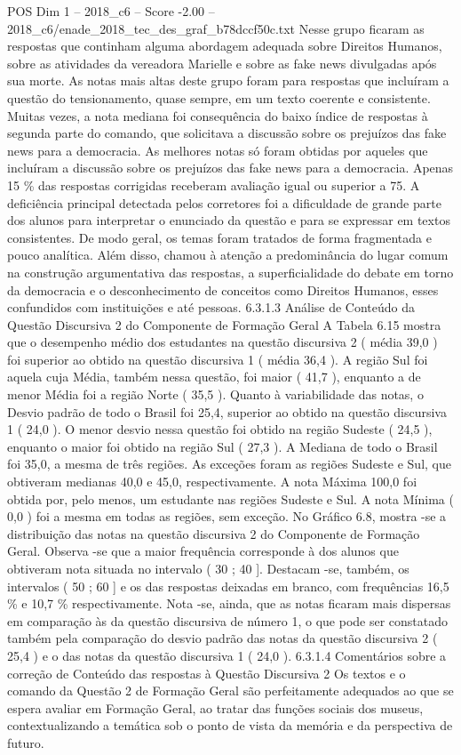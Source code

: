 \begin{textsample}{POS Dim 1 – 2018\_c6 – Score -2.00 – 2018\_c6/enade\_2018\_tec\_des\_graf\_b78dccf50c.txt}
Nesse grupo ficaram as respostas que continham alguma abordagem adequada sobre Direitos Humanos, sobre as atividades da vereadora Marielle e sobre as fake news divulgadas após sua morte.
As notas mais altas deste grupo foram para respostas que incluíram a questão do tensionamento, quase sempre, em um texto coerente e consistente.
Muitas vezes, a nota mediana foi consequência do baixo índice de respostas à segunda parte do comando, que solicitava a discussão sobre os prejuízos das fake news para a democracia.
As melhores notas só foram obtidas por aqueles que incluíram a discussão sobre os prejuízos das fake news para a democracia.
Apenas 15 \% das respostas corrigidas receberam avaliação igual ou superior a 75.
A deficiência principal detectada pelos corretores foi a dificuldade de grande parte dos alunos para interpretar o enunciado da questão e para se expressar em textos consistentes.
De modo geral, os temas foram tratados de forma fragmentada e pouco analítica.
Além disso, chamou à atenção a predominância do lugar comum na construção argumentativa das respostas, a superficialidade do debate em torno da democracia e o desconhecimento de conceitos como Direitos Humanos, esses confundidos com instituições e até pessoas. 6.3.1.3 Análise de Conteúdo da Questão Discursiva 2 do Componente de Formação Geral A Tabela 6.15 mostra que o desempenho médio dos estudantes na questão discursiva 2 ( média 39,0 ) foi superior ao obtido na questão discursiva 1 ( média 36,4 ).
A região Sul foi aquela cuja Média, também nessa questão, foi maior ( 41,7 ), enquanto a de menor Média foi a região Norte ( 35,5 ).
Quanto à variabilidade das notas, o Desvio padrão de todo o Brasil foi 25,4, superior ao obtido na questão discursiva 1 ( 24,0 ).
O menor desvio nessa questão foi obtido na região Sudeste ( 24,5 ), enquanto o maior foi obtido na região Sul ( 27,3 ).
A Mediana de todo o Brasil foi 35,0, a mesma de três regiões.
As exceções foram as regiões Sudeste e Sul, que obtiveram medianas 40,0 e 45,0, respectivamente.
A nota Máxima 100,0 foi obtida por, pelo menos, um estudante nas regiões Sudeste e Sul.
A nota Mínima ( 0,0 ) foi a mesma em todas as regiões, sem exceção.
No Gráfico 6.8, mostra -se a distribuição das notas na questão discursiva 2 do Componente de Formação Geral.
Observa -se que a maior frequência corresponde à dos alunos que obtiveram nota situada no intervalo ( 30 ; 40 ].
Destacam -se, também, os intervalos ( 50 ; 60 ] e os das respostas deixadas em branco, com frequências 16,5 \% e 10,7 \% respectivamente.
Nota -se, ainda, que as notas ficaram mais dispersas em comparação às da questão discursiva de número 1, o que pode ser constatado também pela comparação do desvio padrão das notas da questão discursiva 2 ( 25,4 ) e o das notas da questão discursiva 1 ( 24,0 ). 6.3.1.4 Comentários sobre a correção de Conteúdo das respostas à Questão Discursiva 2 Os textos e o comando da Questão 2 de Formação Geral são perfeitamente adequados ao que se espera avaliar em Formação Geral, ao tratar das funções sociais dos museus, contextualizando a temática sob o ponto de vista da memória e da perspectiva de futuro.

\end{textsample}
